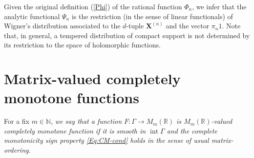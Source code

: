 \documentclass[11pt,reqno]{amsart}
\theoremstyle{plain}
\theoremstyle{definition}
\numberwithin{equation}{section}
\begin{document}
Given the original definition (\ref{Phi}) of the rational function $\Phi_n$, we infer that the analytic functional $\Psi_n$ is the restriction (in the sense of linear functionals) of Wigner's distribution associated to the $d$-tuple $\mathbf{X}^{(n)}$ and the vector $\pi_n 1$.  Note that, in general, a tempered distribution of compact support is not determined by its restriction to the space of holomorphic functions.



\section{Matrix-valued completely monotone functions} \label{Sec:Matrix-CM}
For a fix $m \in \mathbb{N}$, {\em we say that a function $F: \Gamma \rightarrow M_m(\mathbb{R})$ is $M_m(\mathbb{R})$-valued completely monotone function if it is smooth in $\operatorname{int} \Gamma$ and the complete monotonicity sign property \eqref{Eq:CM-cond} holds in the sense of usual matrix-ordering}.
\end{document}
